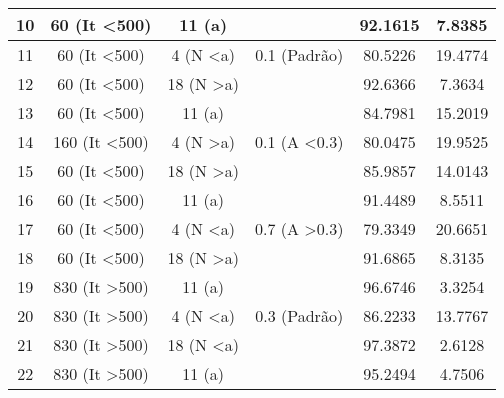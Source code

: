 \documentclass[
	article,			%
	11pt,				%
	oneside,			%
	a4paper,			%
	english,			%
	brazil,				%
	sumario=tradicional
	]{abntex2}
\begin{document}
\begin{table}[h]
\begin{tabular}{|c|c|c|c|c|c|}
		10 & 60 (It \textless 500)                          & 11 (a)                &                          & 92.1615                    & 7.8385                   \\ \hline
		11 & 60 (It \textless 500)                          & 4 (N \textless a)     & 0.1 (Padrão)             & 80.5226                    & 19.4774                  \\ \hline
		12 & 60 (It \textless 500)                          & 18 (N \textgreater a) &                          & 92.6366                    & 7.3634                   \\ \hline
		13 & 60 (It \textless 500)                          & 11 (a)                &                          & 84.7981                    & 15.2019                  \\ \hline
		14 & 160 (It \textless 500)    & 4 (N \textgreater a)  & 0.1 (A \textless 0.3)    & 80.0475                    & 19.9525                  \\ \hline
		15 & 60 (It \textless 500)                          & 18 (N \textgreater a) &                          & 85.9857                    & 14.0143                  \\ \hline
		16 & 60 (It \textless 500)                          & 11 (a)                &                          & 91.4489                    & 8.5511                   \\ \hline
		17 & 60 (It \textless 500)                          & 4 (N \textless a)     & 0.7 (A \textgreater 0.3) & 79.3349                    & 20.6651                  \\ \hline
		18 & 60 (It \textless 500)                          & 18 (N \textgreater a) &                          & 91.6865                    & 8.3135                   \\ \hline
		19 & 830 (It \textgreater 500)                          & 11 (a)                &                          & 96.6746                    & 3.3254                   \\ \hline
		20 & 830 (It \textgreater 500)                          & 4 (N \textless a)     & 0.3 (Padrão)             & 86.2233                    & 13.7767                  \\ \hline
		21 & 830 (It \textgreater 500)                          & 18 (N \textless a)    &                          & 97.3872                    & 2.6128                   \\ \hline
		22 & 830 (It \textgreater 500)                          & 11 (a)                &                          & 95.2494                    & 4.7506                   \\ \hline

\end{tabular}
\end{table}
\end{document}
